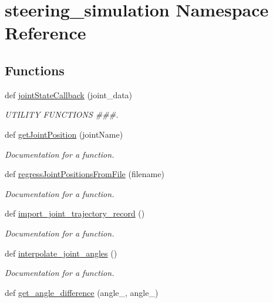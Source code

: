 \hypertarget{namespacesteering__simulation}{}\section{steering\+\_\+simulation Namespace Reference}
\label{namespacesteering__simulation}
\subsection*{Functions}
\begin{DoxyCompactItemize}
\item 
def \mbox{\hyperlink{namespacesteering__simulation_a49d8e64bcd7d1221d6de01b9b22bb799}{joint\+State\+Callback}} (joint\+\_\+data)
\begin{DoxyCompactList}\small\item\em U\+T\+I\+L\+I\+TY F\+U\+N\+C\+T\+I\+O\+NS \#\#\#. \end{DoxyCompactList}\item 
def \mbox{\hyperlink{namespacesteering__simulation_a058dbff61afc8af058769267605ffc5a}{get\+Joint\+Position}} (joint\+Name)
\begin{DoxyCompactList}\small\item\em Documentation for a function. \end{DoxyCompactList}\item 
def \mbox{\hyperlink{namespacesteering__simulation_a3bdf7d63620ec8e0a63d41324b1cdaa4}{regress\+Joint\+Positions\+From\+File}} (filename)
\begin{DoxyCompactList}\small\item\em Documentation for a function. \end{DoxyCompactList}\item 
def \mbox{\hyperlink{namespacesteering__simulation_a628f6027d970db8d4071e5846de522fc}{import\+\_\+joint\+\_\+trajectory\+\_\+record}} ()
\begin{DoxyCompactList}\small\item\em Documentation for a function. \end{DoxyCompactList}\item 
def \mbox{\hyperlink{namespacesteering__simulation_a6e3b1fe25edfbec1713a6bd3ef2a445e}{interpolate\+\_\+joint\+\_\+angles}} ()
\begin{DoxyCompactList}\small\item\em Documentation for a function. \end{DoxyCompactList}\item 
def \mbox{\hyperlink{namespacesteering__simulation_a920f69692c79162b2296b1a220bba527}{get\+\_\+angle\+\_\+difference}} (angle\+\_, angle\+\_)

\end{DoxyCompactItemize}
